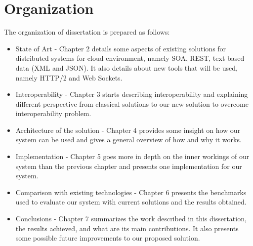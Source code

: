 \section{Organization}
\label{section:organization}

The organization of dissertation is prepared as follows:

\begin{itemize}
\item State of Art - Chapter 2 details some aspects of existing solutions for distributed systems for cloud environment, namely SOA, REST, text based data (XML and JSON). It also details about new tools that will be used, namely HTTP/2 and Web Sockets.
\item Interoperability - Chapter 3 starts describing interoperability and explaining different perspective from classical solutions to our new solution to overcome interoperability problem.
\item Architecture of the solution - Chapter 4 provides some insight on how our system can be used and gives a general overview of how and why it works.
\item Implementation - Chapter 5 goes more in depth on the inner workings of our system than the previous chapter and presents one implementation for our system.
\item Comparison with existing technologies - Chapter 6 presents the benchmarks used to evaluate our system with current solutions and the results obtained.
\item Conclusions - Chapter 7 summarizes the work described in this dissertation, the results achieved, and what are its main contributions. It also presents some possible future improvements to our proposed solution.
\end{itemize}
